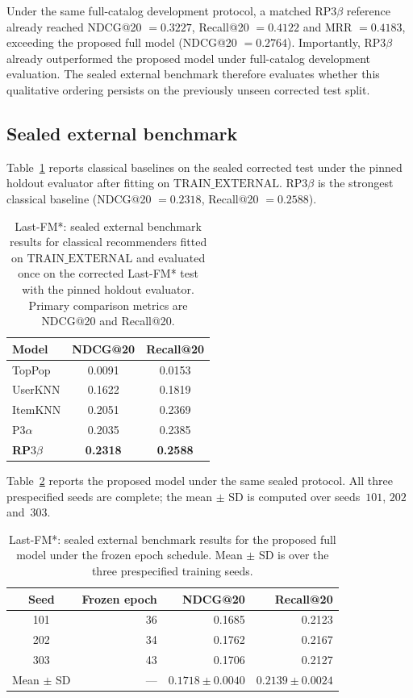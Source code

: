 Under the same full-catalog development protocol, a matched RP$3\beta$ reference already reached NDCG@20 $=0.3227$, Recall@20 $=0.4122$ and MRR $=0.4183$, exceeding the proposed full model (NDCG@20 $=0.2764$).
Importantly, RP$3\beta$ already outperformed the proposed model under full-catalog development evaluation.
The sealed external benchmark therefore evaluates whether this qualitative ordering persists on the previously unseen corrected test split.

\subsection{Sealed external benchmark}
\label{sec:lastfm-sealed-results}

Table~\ref{tab:lastfm-sealed-baselines} reports classical baselines on the sealed corrected test under the pinned holdout evaluator after fitting on $\mathrm{TRAIN\_EXTERNAL}$.
RP$3\beta$ is the strongest classical baseline (NDCG@20 $=0.2318$, Recall@20 $=0.2588$).

\begin{table}[htbp]
\centering
\small
\caption{Last-FM*: sealed external benchmark results for classical recommenders fitted on $\mathrm{TRAIN\_EXTERNAL}$ and evaluated once on the corrected Last-FM* test with the pinned holdout evaluator.
Primary comparison metrics are NDCG@20 and Recall@20.}
\label{tab:lastfm-sealed-baselines}
\begin{tabular}{@{}lcc@{}}
\toprule
Model & NDCG@20 & Recall@20 \\
\midrule
TopPop & 0.0091 & 0.0153 \\
UserKNN & 0.1622 & 0.1819 \\
ItemKNN & 0.2051 & 0.2369 \\
P3$\alpha$ & 0.2035 & 0.2385 \\
\textbf{RP$3\beta$} & \textbf{0.2318} & \textbf{0.2588} \\
\bottomrule
\end{tabular}
\end{table}

Table~\ref{tab:lastfm-sealed-proposed} reports the proposed model under the same sealed protocol.
All three prespecified seeds are complete; the mean $\pm$ SD is computed over seeds~$101$, $202$ and~$303$.

\begin{table}[htbp]
\centering
\small
\caption{Last-FM*: sealed external benchmark results for the proposed full model under the frozen epoch schedule.
Mean $\pm$ SD is over the three prespecified training seeds.}
\label{tab:lastfm-sealed-proposed}
\begin{tabular}{@{}crrr@{}}
\toprule
Seed & Frozen epoch & NDCG@20 & Recall@20 \\
\midrule
101 & 36 & 0.1685 & 0.2123 \\
202 & 34 & 0.1762 & 0.2167 \\
303 & 43 & 0.1706 & 0.2127 \\
\midrule
Mean \(\pm\) SD & --- & \(0.1718\pm 0.0040\) & \(0.2139\pm 0.0024\) \\
\bottomrule
\end{tabular}
\end{table}

